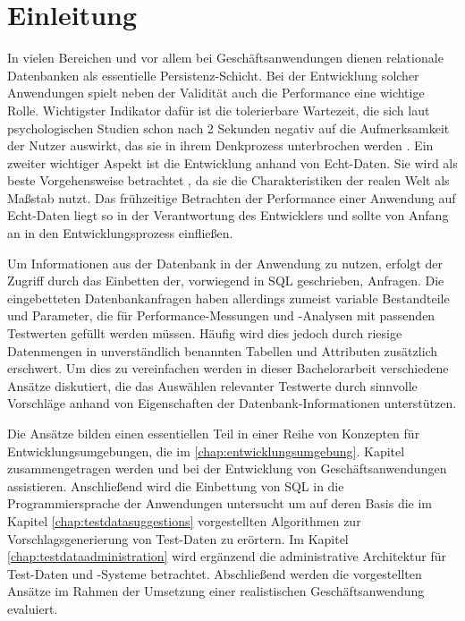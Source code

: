 \section{Einleitung}\label{chap:introduction}

%
%

In vielen Bereichen und vor allem bei Geschäftsanwendungen dienen relationale Datenbanken als essentielle Persistenz-Schicht.
Bei der Entwicklung solcher Anwendungen spielt neben der Validität auch die Performance eine wichtige Rolle.
Wichtigster Indikator dafür ist die tolerierbare Wartezeit, die sich laut psychologischen Studien schon nach 2 Sekunden negativ auf die Aufmerksamkeit der Nutzer auswirkt, das sie in ihrem Denkprozess unterbrochen werden \cite{Nah04}.
Ein zweiter wichtiger Aspekt ist die Entwicklung anhand von Echt-Daten.
Sie wird als beste Vorgehensweise betrachtet \cite[S. 212]{Plattner:2013:CID:2490529}, da sie die Charakteristiken der realen Welt als Maßstab nutzt.
Das frühzeitige Betrachten der Performance einer Anwendung auf Echt-Daten liegt so in der Verantwortung des Entwicklers und sollte von Anfang an in den Entwicklungsprozess einfließen.

Um Informationen aus der Datenbank in der Anwendung zu nutzen, erfolgt der Zugriff durch das Einbetten der, vorwiegend in SQL geschrieben, Anfragen.
Die eingebetteten Datenbankanfragen haben allerdings zumeist variable Bestandteile und Parameter, die für Performance-Messungen und -Analysen mit passenden Testwerten gefüllt werden müssen.
Häufig wird dies jedoch durch riesige Datenmengen in unverständlich benannten Tabellen und Attributen zusätzlich erschwert.
Um dies zu vereinfachen werden in dieser Bachelorarbeit verschiedene Ansätze diskutiert, die das Auswählen relevanter Testwerte durch sinnvolle Vorschläge anhand von Eigenschaften der Datenbank-Informationen unterstützen.

Die Ansätze bilden einen essentiellen Teil in einer Reihe von Konzepten für Entwicklungsumgebungen, die im \ref{chap:entwicklungsumgebung}. Kapitel zusammengetragen werden und bei der Entwicklung von Geschäftsanwendungen assistieren.
Anschließend wird die Einbettung von SQL in die Programmiersprache der Anwendungen untersucht um auf deren Basis die im Kapitel \ref{chap:testdatasuggestions} vorgestellten Algorithmen zur Vorschlagsgenerierung von Test-Daten zu erörtern.
Im Kapitel \ref{chap:testdataadministration} wird ergänzend die administrative Architektur für Test-Daten und -Systeme betrachtet.
Abschließend werden die vorgestellten Ansätze im Rahmen der Umsetzung einer realistischen Geschäftsanwendung evaluiert.